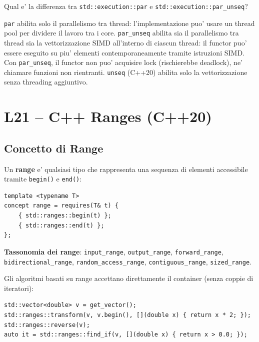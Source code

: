 \documentclass[11pt,a4paper]{article}
\theoremstyle{remark}
\newenvironment{esercizio}[1][]{%
  \begin{tcolorbox}[breakable,title={\textbf{Esercizio / Domanda d'esame}\ifx&#1&\else: #1\fi},
    colback=yellow!5!white, colframe=orange!75!black, fonttitle=\small\bfseries]%
}{%
  \end{tcolorbox}%
}
\newenvironment{risposta}{%
  \begin{tcolorbox}[breakable,title={\textbf{Risposta}},
    colback=green!5!white, colframe=green!50!black, fonttitle=\small\bfseries]%
}{%
  \end{tcolorbox}%
}
\begin{document}
\begin{esercizio}
Qual e' la differenza tra \lstinline|std::execution::par| e \lstinline|std::execution::par_unseq|?
\end{esercizio}
\begin{risposta}
\lstinline|par| abilita solo il parallelismo tra thread: l'implementazione puo' usare un thread pool per dividere il lavoro tra i core. \lstinline|par_unseq| abilita sia il parallelismo tra thread sia la vettorizzazione SIMD all'interno di ciascun thread: il functor puo' essere eseguito su piu' elementi contemporaneamente tramite istruzioni SIMD. Con \lstinline|par_unseq|, il functor non puo' acquisire lock (rischierebbe deadlock), ne' chiamare funzioni non rientranti. \lstinline|unseq| (C++20) abilita solo la vettorizzazione senza threading aggiuntivo.
\end{risposta}

\section{L21 -- C++ Ranges (C++20)}

\subsection{Concetto di Range}

Un \textbf{range} e' qualsiasi tipo che rappresenta una sequenza di elementi accessibile tramite \lstinline|begin()| e \lstinline|end()|:
\begin{lstlisting}[style=cpp]
template <typename T>
concept range = requires(T& t) {
    { std::ranges::begin(t) };
    { std::ranges::end(t) };
};
\end{lstlisting}

\textbf{Tassonomia dei range}: \lstinline|input_range|, \lstinline|output_range|, \lstinline|forward_range|, \lstinline|bidirectional_range|, \lstinline|random_access_range|, \lstinline|contiguous_range|, \lstinline|sized_range|.

Gli algoritmi basati su range accettano direttamente il container (senza coppie di iteratori):
\begin{lstlisting}[style=cpp]
std::vector<double> v = get_vector();
std::ranges::transform(v, v.begin(), [](double x) { return x * 2; });
std::ranges::reverse(v);
auto it = std::ranges::find_if(v, [](double x) { return x > 0.0; });
\end{lstlisting}
\end{document}
